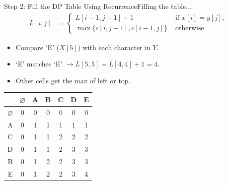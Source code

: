 \documentclass{beamer}
\begin{document}
\begin{frame}{Step 2: Fill the DP Table Using Recurrence}{Filling the table...}
    \vspace{-10mm}
    \scriptsize
    \begin{equation*}
        \begin{align*}
            L[i, j] &=
                        \begin{cases}
                            L[i - 1, j - 1] + 1 & \text{ if } x[i] = y[j] \text{, } \\
                            \max \{ c[i, j - 1], c[i - 1, j] \} & \text{ otherwise.}
                        \end{cases}
        \end{align*}
    \end{equation*}
    \begin{itemize}
        \item Compare `E' ($X[5]$) with each character in $Y$.
        \item `E' matches `E' $\longrightarrow L[5,5] = L[4,4] + 1 = 4$.
        \item Other cells get the max of left or top.
    \end{itemize}
    \vspace{6mm}
    \normalsize
    \centering
    \begin{tabular}{|c|c|c|c|c|c|c|} \hline
                      & $\varnothing$ & A & B & C & D & E \\ \hline
        $\varnothing$ &        0      & 0 & 0 & 0 & 0 & 0 \\ \hline
               A      &        0      & 1 & 1 & 1 & 1 & 1 \\ \hline
               C      &        0      & 1 & 1 & 2 & 2 & 2 \\ \hline
               D      &        0      & 1 & 1 & 2 & 3 & 3 \\ \hline
               B      &        0      & 1 & 2 & 2 & 3 & 3 \\ \hline
               E      &        0      & 1 & 2 & 2 & 3 & 4 \\ \hline
    \end{tabular}
\end{frame}
\end{document}
